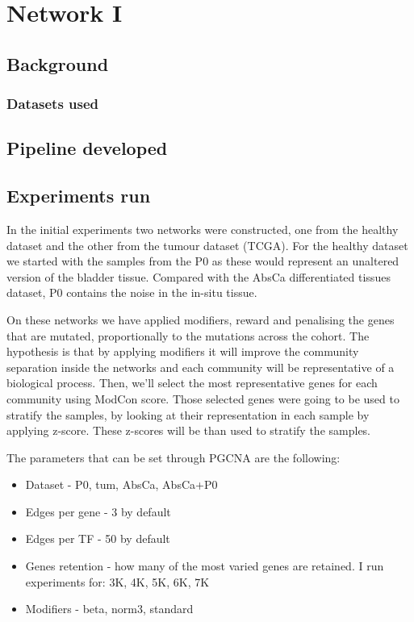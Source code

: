 \section{Network I}

\subsection{Background}

\subsubsection{Datasets used}

\subsection{Pipeline developed}

\subsection{Experiments run}

In the initial experiments two networks were constructed, one from the healthy dataset and the other from the tumour dataset (TCGA). For the healthy dataset we started with the samples from the P0 as these would represent an unaltered version of the bladder tissue. Compared with the AbsCa differentiated tissues dataset, P0 contains the noise in the in-situ tissue. 

On these networks we have applied modifiers, reward and penalising the genes that are mutated, proportionally to the mutations across the cohort. The hypothesis is that by applying modifiers it will improve the community separation inside the networks and each community will be representative of a biological process. Then, we'll select the most representative genes for each community using ModCon score. Those selected genes were going to be used to stratify the samples, by looking at their representation in each sample by applying z-score. These z-scores will be than used to stratify the samples.

The parameters that can be set through PGCNA are the following:
\begin{itemize}
    \item Dataset - P0, tum, AbsCa, AbsCa+P0
    \item Edges per gene - 3 by default
    \item Edges per TF - 50 by default 
    \item Genes retention - how many of the most varied genes are retained. I run experiments for: 3K, 4K, 5K, 6K, 7K
    \item Modifiers - beta, norm3, standard
\end{itemize}

